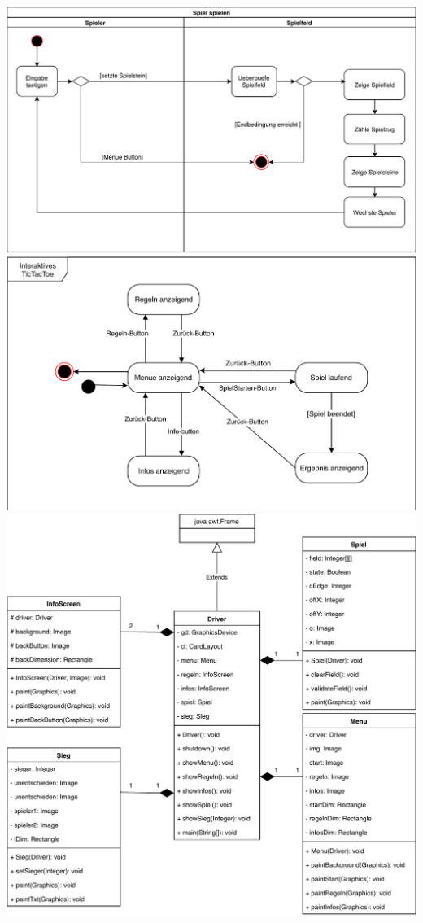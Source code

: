 \documentclass[12pt]{article}
\begin{document}
\includegraphics[scale=0.85]{Aktivitaetsdiagramm.pdf}
\vspace{5cm}
\includegraphics[scale=0.9]{Zustandsdiagramm.pdf}\\

\includegraphics[scale=0.85]{Klassendiagramm.pdf}
\end{document}

